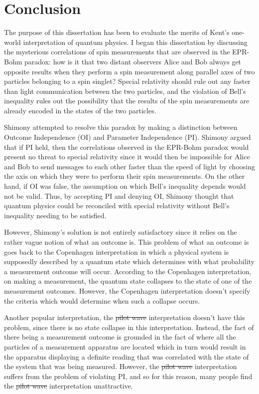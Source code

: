 \documentclass[12pt]{report}
\providecommand{\DIFadd}[1]{{\protect\color{blue}\uwave{#1}}} %
\providecommand{\DIFdel}[1]{{\protect\color{red}\sout{#1}}}                      %
\providecommand{\DIFaddbegin}{} %
\providecommand{\DIFaddend}{} %
\providecommand{\DIFdelbegin}{} %
\providecommand{\DIFdelend}{} %
\begin{document}

\chapter*{Conclusion}
The purpose of this dissertation has been to evaluate the merits of Kent's one-world interpretation of quantum physics. I began this dissertation by discussing the mysterious correlations of spin measurements that are observed in the EPR-Bohm paradox: how is it that two distant observers Alice and Bob always get opposite results when they perform a spin measurement along parallel axes of two particles belonging to a spin singlet? Special relativity should rule out any faster than light communication between the two particles, and the violation of Bell's inequality rules out the possibility that the results of the spin measurements are already encoded in the states of the two particles.

Shimony attempted to resolve this paradox by making a distinction between Outcome Independence (OI) and Parameter Independence (PI). Shimony argued that if PI held, then the correlations observed in the EPR-Bohm paradox would present no threat to special relativity since it would then be impossible for Alice and Bob to send messages to each other faster than the speed of light by choosing the axis on which they were to perform their spin measurements. On the other hand, if OI was false, the assumption on which Bell's inequality depends would not be valid. Thus, by accepting PI and denying OI, Shimony thought that quantum physics could be reconciled with special relativity without Bell's inequality needing to be satisfied. 

However, Shimony's solution is not entirely satisfactory since it relies on the rather vague notion of what an outcome is. This problem of what an outcome is goes back to the Copenhagen interpretation in which a physical system is supposedly described by a quantum state which determines with what probability a measurement outcome will occur. According to the Copenhagen interpretation, on making a measurement, the quantum state collapses to the state of one of the measurement outcomes. However, the Copenhagen interpretation doesn't specify the criteria which would determine when such a collapse occurs. 

Another popular interpretation, the \DIFdelbegin \DIFdel{pilot wave }\DIFdelend \DIFaddbegin \DIFadd{Bohmian }\DIFaddend interpretation doesn't have this problem, since there is no state collapse in this interpretation. Instead, the fact of there being a measurement outcome is grounded in the fact of where all the particles of a measurement apparatus are located which in turn would result in the apparatus displaying a definite reading that was correlated with the state of the system that was being measured.  However, the \DIFdelbegin \DIFdel{pilot wave }\DIFdelend \DIFaddbegin \DIFadd{Bohmian }\DIFaddend interpretation suffers from the problem of violating PI, and so for this reason, many people find the \DIFdelbegin \DIFdel{pilot wave }\DIFdelend \DIFaddbegin \DIFadd{Bohmian }\DIFaddend interpretation unattractive. 
\end{document}
